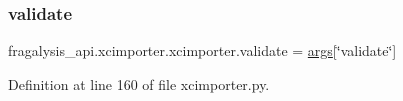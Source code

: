 \subsubsection{\texorpdfstring{validate}{validate}}
{\footnotesize\ttfamily fragalysis\+\_\+api.\+xcimporter.\+xcimporter.\+validate = \hyperlink{namespacefragalysis__api_1_1xcimporter_1_1xcimporter_a3ad0db7b1c2c8a00d4963bf5f7dd21bc}{args}\mbox{[}\char`\"{}validate\char`\"{}\mbox{]}}



Definition at line 160 of file xcimporter.\+py.

